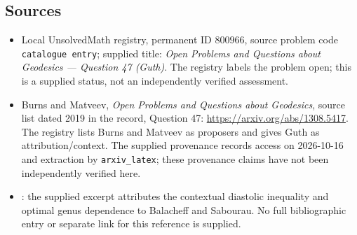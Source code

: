 \documentclass[11pt]{article}
\begin{document}
\subsection{Sources}
\begin{itemize}
\item Local UnsolvedMath registry, permanent ID \(800966\), source problem code \texttt{catalogue entry}; supplied title: \emph{Open Problems and Questions about Geodesics --- Question 47 (Guth)}. The registry labels the problem open; this is a supplied status, not an independently verified assessment.
\item Burns and Matveev, \emph{Open Problems and Questions about Geodesics}, source list dated 2019 in the record, Question 47: \url{https://arxiv.org/abs/1308.5417}. The registry lists Burns and Matveev as proposers and gives Guth as attribution/context. The supplied provenance records access on 2026-10-16 and extraction by \texttt{arxiv\_latex}; these provenance claims have not been independently verified here.
\item [Bal-Sab2010]: the supplied excerpt attributes the contextual diastolic inequality and optimal genus dependence to Balacheff and Sabourau. No full bibliographic entry or separate link for this reference is supplied.
\end{itemize}
\end{document}
